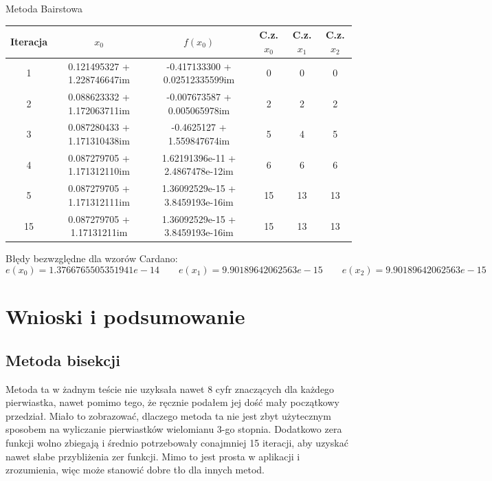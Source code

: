 \documentclass[a4paper]{article}
\begin{document}
    \begin{center}
        Metoda Bairstowa
    \end{center}
    \begin{center}
        \begin{tabular}{|c|c|c|c|c|c|} 
            \hline
            Iteracja & $x_0$ & $f(x_0)$ & C.z. $x_0$ & C.z. $x_1$ & C.z. $x_2$ \\
            \hline
            1 & 0.121495327 + 1.228746647im & -0.417133300 + 0.02512335599im & 0 & 0 & 0 \\ 
            \hline
            2 & 0.088623332 + 1.172063711im & -0.007673587 + 0.005065978im & 2 & 2 & 2 \\ 
            \hline
            3 & 0.087280433 + 1.171310438im & -0.4625127 + 1.559847674im & 5 & 4 & 5 \\
            \hline
            4 & 0.087279705 + 1.171312110im &  1.62191396e-11 + 2.4867478e-12im & 6 & 6 & 6 \\
            \hline
            5 & 0.087279705 + 1.171312111im &  1.36092529e-15 + 3.8459193e-16im & 15 & 13 & 13 \\
            \hline
            15 & 0.087279705 + 1.17131211im &  1.36092529e-15 + 3.8459193e-16im & 15 & 13 & 13 \\
            \hline
        \end{tabular}
    \end{center}

    \vspace{5mm}

    \begin{center}
        Błędy bezwzględne dla wzorów Cardano:
        \[
            e(x_0) = 1.3766765505351941e-14 \qquad e(x_1) = 9.90189642062563e-15 \qquad e(x_2) = 9.90189642062563e-15
        \]
    \end{center}
    
\newpage
\section{Wnioski i podsumowanie}
    \subsection{Metoda bisekcji}
        Metoda ta w żadnym teście nie uzyksała nawet 8 cyfr znaczących dla każdego pierwiastka, nawet
        pomimo tego, że ręcznie podałem jej dość mały początkowy przedział. Miało to zobrazować, dlaczego
        metoda ta nie jest zbyt użytecznym sposobem na wyliczanie pierwiastków wielomianu 3-go stopnia.
        Dodatkowo zera funkcji wolno zbiegają i średnio potrzebowały conajmniej 15 iteracji, aby uzyskać
        nawet słabe przybliżenia zer funkcji. Mimo to jest prosta w aplikacji i zrozumienia, więc może stanowić
        dobre tło dla innych metod.
        
\end{document}
